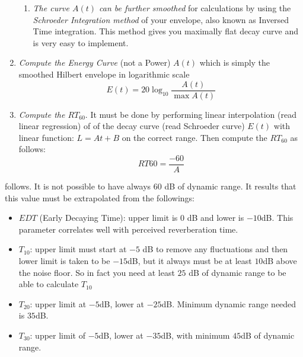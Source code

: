\begin{enumerate}
\begin{enumerate}
        \item \textit{The curve $A(t)$ can be further smoothed} for calculations by using the
        \textit{Schroeder Integration method} of your envelope, also known as Inversed Time integration.
        This method gives you maximally flat decay curve and is very easy to implement.

    \end{enumerate}

    \item \textit{Compute the Energy Curve} (not a Power) $A(t)$ which is simply the smoothed Hilbert envelope in logarithmic scale
    \begin{equation}
        E(t) = 20 \log_{10}{\frac{A(t)}{\max{A(t)}}}
    \end{equation}

    \item \textit{Compute the $RT_{60}$}. It must be done by performing linear interpolation (read linear regression)
    of of the decay curve (read Schroeder curve) $E(t)$ with linear function: $L=At + B$ on the correct range.
    Then compute the $RT_{60}$ as follows:
    \begin{equation}
        RT60 = \frac{-60}{A}
    \end{equation}
\end{enumerate}

 follows. It is not possible to have always $60$ dB of
dynamic range. It results that this value must be extrapolated from the followings:
\begin{itemize}
    \item $EDT$ (Early Decaying Time): upper limit is $0$ dB and lower is $-10$dB.
    This parameter correlates well with perceived reverberation time.
    \item $T_{10}$:  upper limit must start at $-5$ dB to remove any
    fluctuations and then lower limit is taken to be $-15$dB,
    but it always must be at least $10$dB above the noise floor.
    So in fact you need at least $25$ dB of dynamic range to be able to calculate $T_{10}$
    \item $T_{20}$: upper limit at $-5$dB, lower at $-25$dB.
    Minimum dynamic range needed is $35$dB.
    \item $T_{30}$: upper limit of $-5$dB, lower at $-35$dB, with minimum $45$dB of dynamic range.
\end{itemize}

